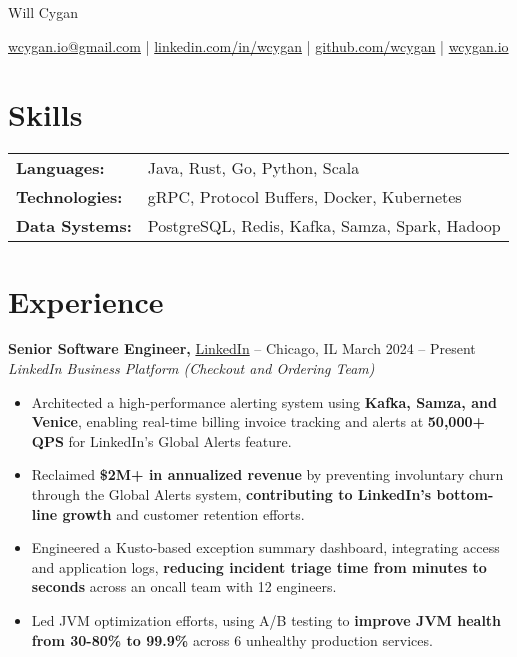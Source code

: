 \documentclass[10pt]{article}
\begin{document}
\centerline{\Huge Will Cygan}

\vspace{5pt}

\centerline{\href{mailto:wcygan.io@gmail.com}{wcygan.io@gmail.com} | \href{https://linkedin.com/in/wcygan}{linkedin.com/in/wcygan} | \href{https://github.com/wcygan}{github.com/wcygan} | \href{https://www.wcygan.io}{wcygan.io}}

\vspace{5pt}

\section*{Skills}
\vspace{4pt}
\begin{tabular}{@{}ll@{}}
\textbf{Languages:} & Java, Rust, Go, Python, Scala \\
\textbf{Technologies:} & gRPC, Protocol Buffers, Docker, Kubernetes \\
\textbf{Data Systems:} & PostgreSQL, Redis, Kafka, Samza, Spark, Hadoop
\end{tabular}

\vspace{5pt}

\section*{Experience}
\vspace{4pt}
\textbf{Senior Software Engineer,} \href{https://www.linkedin.com/}{LinkedIn} -- Chicago, IL \hfill March 2024 -- Present \\
{\small\textit{LinkedIn Business Platform (Checkout and Ordering Team)}}
\vspace{1pt}
\begin{itemize}
  \item Architected a high-performance alerting system using \textbf{Kafka, Samza, and Venice}, enabling real-time billing invoice tracking and alerts at \textbf{50,000+ QPS} for LinkedIn's Global Alerts feature.
  \item Reclaimed \textbf{\$2M+ in annualized revenue} by preventing involuntary churn through the Global Alerts system, \textbf{contributing to LinkedIn's bottom-line growth} and customer retention efforts.
  \item Engineered a Kusto-based exception summary dashboard, integrating access and application logs, \textbf{reducing incident triage time from minutes to seconds} across an oncall team with 12 engineers.
  \item Led JVM optimization efforts, using A/B testing to \textbf{improve JVM health from 30-80\% to 99.9\%} across 6 unhealthy production services.
\end{itemize}
\end{document}
